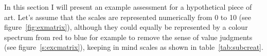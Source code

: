 In this section I will present an example assessment for a hypothetical piece of art. Let's assume that the scales are represented numerically from 0 to 10 (see figure~\ref{fig:exmatrix}), although they could equally be represented by a colour spectrum from red to blue for example to remove the sense of value judgments (see figure~\ref{s:excmatrix}), keeping in mind scales as shown in table~\ref{tab:subcreat}. 





